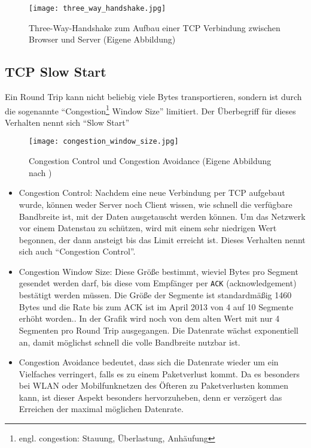 		\begin{figure}[htbp]
			\begin{center}
				\texttt{[image: three\_way\_handshake.jpg]}
				\caption{Three-Way-Handshake zum Aufbau einer TCP Verbindung zwischen Browser und Server (Eigene Abbildung)}
				\label{fig:three_way_handshake}
			\end{center}
		\end{figure}

	\subsection{TCP Slow Start} %
	\label{sub:tcp_slow_start}

		Ein Round Trip kann nicht beliebig viele Bytes transportieren, sondern ist durch die sogenannte "`Congestion\footnote{engl. congestion: Stauung, Überlastung, Anhäufung} Window Size"' limitiert. Der Überbegriff für dieses Verhalten nennt sich "`Slow Start"'

		\begin{figure}[htbp]
			\begin{center}
				\texttt{[image: congestion\_window\_size.jpg]}
				\caption{Congestion Control und Congestion Avoidance (Eigene Abbildung nach \autocite{grigorikSlowStart})}
				\label{fig:congestion_window_size}
			\end{center}
		\end{figure} 

		\begin{itemize}
			\item Congestion Control: Nachdem eine neue Verbindung per TCP aufgebaut wurde, können weder Server noch Client wissen, wie schnell die verfügbare Bandbreite ist, mit der Daten ausgetauscht werden können. Um das Netzwerk vor einem Datenstau zu schützen, wird mit einem sehr niedrigen Wert begonnen, der dann ansteigt bis das Limit erreicht ist. Dieses Verhalten nennt sich auch "`Congestion Control"'.

			\item Congestion Window Size: Diese Größe bestimmt, wieviel Bytes pro Segment gesendet werden darf, bis diese vom Empfänger per \texttt{ACK} (acknowledgement) bestätigt werden müssen. Die Größe der Segmente ist standardmäßig 1460 Bytes und die Rate bis zum ACK ist im April 2013 von 4 auf 10 Segmente erhöht worden.\autocite{grigorikSlowStart}. In der Grafik wird noch von dem alten Wert mit nur 4 Segmenten pro Round Trip ausgegangen. Die Datenrate wächst exponentiell an, damit möglichst schnell die volle Bandbreite nutzbar ist.

			\item Congestion Avoidance bedeutet, dass sich die Datenrate wieder um ein Vielfaches verringert, falls es zu einem Paketverlust kommt. Da es besonders bei WLAN oder Mobilfunknetzen des Öfteren zu Paketverlusten kommen kann, ist dieser Aspekt besonders hervorzuheben, denn er verzögert das Erreichen der maximal möglichen Datenrate.
		\end{itemize}

